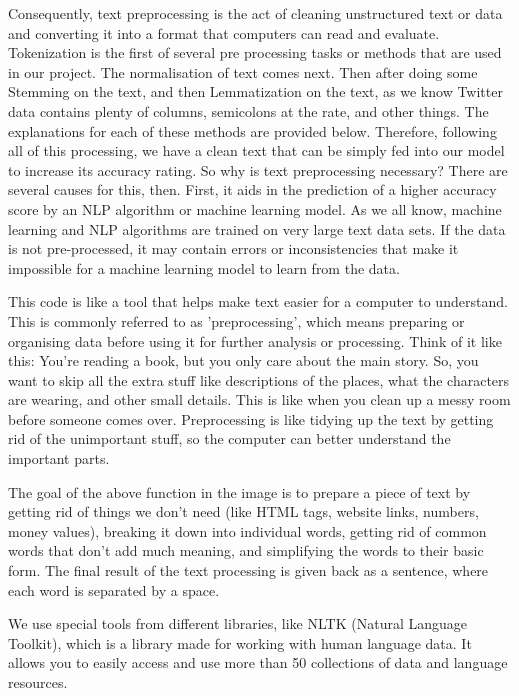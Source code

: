 \documentclass[12pt, a4paper,twoside]{report}
\theoremstyle{plain} %
\theoremstyle{definition} %
\theoremstyle{remark} %
\numberwithin{equation}{chapter}
\begin{document}
    Consequently, text preprocessing is the act of cleaning unstructured text or data and converting it into a format that computers can read and evaluate. Tokenization is the first of several pre processing tasks or methods that are used in our project. The normalisation of text comes next. Then after doing some Stemming on the text, and then Lemmatization on the text, as we know Twitter data contains plenty of columns, semicolons at the rate, and other things. The explanations for each of these methods are provided below. Therefore, following all of this processing, we have a clean text that can be simply fed into our model to increase its accuracy rating. So why is text preprocessing necessary? There are several causes for this, then. First, it aids in the prediction of a higher accuracy score by an NLP algorithm or machine learning model. As we all know, machine learning and NLP algorithms are trained on very large text data sets. If the data is not pre-processed, it may contain errors or inconsistencies that make it impossible for a machine learning model to learn from the data.

    This code is like a tool that helps make text easier for a computer to understand. This is commonly referred to as 'preprocessing', which means preparing or organising data before using it for further analysis or processing. Think of it like this: You're reading a book, but you only care about the main story. So, you want to skip all the extra stuff like descriptions of the places, what the characters are wearing, and other small details. This is like when you clean up a messy room before someone comes over. Preprocessing is like tidying up the text by getting rid of the unimportant stuff, so the computer can better understand the important parts.
    
    The goal of the above function in the image is to prepare a piece of text by getting rid of things we don't need (like HTML tags, website links, numbers, money values), breaking it down into individual words, getting rid of common words that don't add much meaning, and simplifying the words to their basic form. The final result of the text processing is given back as a sentence, where each word is separated by a space.
    
    We use special tools from different libraries, like NLTK (Natural Language Toolkit), which is a library made for working with human language data. It allows you to easily access and use more than 50 collections of data and language resources.
    
\end{document}
